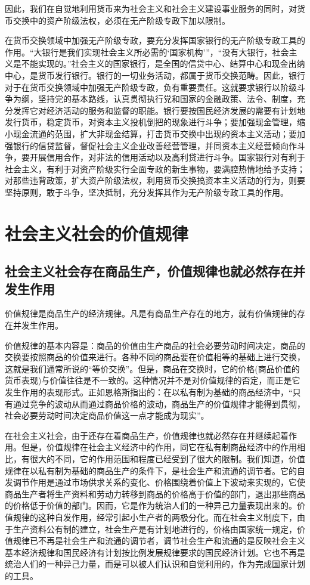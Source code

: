 \documentclass{book}
\begin{document}
因此，我们在自觉地利用货币来为社会主义和社会主义建设事业服务的同时，对货币交换中的资产阶级法权，必须在无产阶级专政下加以限制。

在货币交换领域中加强无产阶级专政，要充分发挥国家银行的无产阶级专政工具的作用。“大银行是我们实现社会主义所必需的‘国家机构’”，“没有大银行，社会主义是不能实现的。”社会主义的国家银行，是全国的信贷中心、结算中心和现金出纳中心，是货币发行银行。银行的一切业务活动，都属于货币交换范畴。因此，银行对于在货币交换领域中加强无产阶级专政，负有重要责任。这就要求银行以阶级斗争为纲，坚持党的基本路线，认真贯彻执行党和国家的金融政策、法令、制度，充分发挥它对经济活动的服务和监督的职能。银行要按国民经济发展的需要有计划地发行货币，稳定货币，对资本主义投机倒把的现象进行斗争；要加强现金管理，缩小现金流通的范围，扩大非现金结算，打击货币交换中出现的资本主义活动；要加强银行的信贷监督，督促社会主义企业改善经营管理，并同资本主义经营倾向作斗争，要开展信用合作，对非法的信用活动以及高利贷进行斗争。国家银行对有利于社会主义，有利于对资产阶级实行全面专政的新生事物，要满腔热情地给予支持；对那些违背政策，扩大资产阶级法权，利用货币交换搞资本主义活动的行为，则要坚持原则，敢于斗争，坚决抵制，充分发挥其作为无产阶级专政工具的作用。

\section{社会主义社会的价值规律}

\subsection{社会主义社会存在商品生产，价值规律也就必然存在并发生作用}

价值规律是商品生产的经济规律。凡是有商品生产存在的地方，就有价值规律的存在并发生作用。

价值规律的基本内容是：商品的价值由生产商品的社会必要劳动时间决定，商品的交换要按照商品的价值来进行。各种不同的商品要在价值相等的基础上进行交换，这就是我们通常所说的“等价交换”。但是，商品在交换时，它的价格(商品价值的货币表现)与价值往往是不一致的。这种情况并不是对价值规律的否定，而正是它发生作用的表现形式。正如恩格斯指出的：在以私有制为基础的商品经济中，“只有通过竞争的波动从而通过商品价格的波动，商品生产的价值规律才能得到贯彻，社会必要劳动时间决定商品价值这一点才能成为现实”。

在社会主义社会，由于还存在着商品生产，价值规律也就必然存在并继续起着作用。但是，价值规律在社会主义经济中的作用，同它在私有制商品经济中的作用相比，有很大的不同，它的作用范围和程度已经受到了很大的限制。我们知道，价值规律在以私有制为基础的商品生产的条件下，是社会生产和流通的调节者。它的自发调节作用是通过市场供求关系的变化、价格围绕着价值上下波动来实现的，它使商品生产者将生产资料和劳动力转移到商品的价格高于价值的部门，退出那些商品的价格低于价值的部门。因而，它是作为统治人们的一种异己力量表现出来的。价值规律的这种自发作用，经常引起小生产者的两极分化。而在社会主义制度下，由于生产资料公有制的建立，社会生产是有计划地进行的，价格由国家统一规定，价值规律已不再是社会生产和流通的调节者，调节社会生产和流通的是反映社会主义基本经济规律和国民经济有计划按比例发展规律要求的国民经济计划。它也不再是统治人们的一种异己力量，而是可以被人们认识和自觉利用的，作为完成国家计划的工具。
\end{document}
